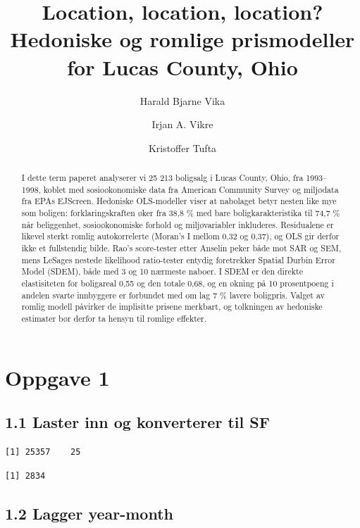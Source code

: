 \documentclass[
  norsk,
  a4paper,
]{article}
\title{Location, location, location? Hedoniske og romlige prismodeller
for Lucas County, Ohio}
\author{Harald Bjarne Vika \and Irjan A. Vikre \and Kristoffer Tufta}
\date{}
\renewcommand*\contentsname{Innholdsfortegnelse}
\newcommand\contentsname{Innholdsfortegnelse}
\begin{document}
\maketitle
\begin{abstract}
I dette term paperet analyserer vi 25 213 boligsalg i Lucas County,
Ohio, fra 1993--1998, koblet med sosioøkonomiske data fra American
Community Survey og miljødata fra EPAs EJScreen. Hedoniske OLS-modeller
viser at nabolaget betyr nesten like mye som boligen: forklaringskraften
øker fra 38,8 \% med bare boligkarakteristika til 74,7 \% når
beliggenhet, sosioøkonomiske forhold og miljøvariabler inkluderes.
Residualene er likevel sterkt romlig autokorrelerte (Moran's I mellom
0,32 og 0,37), og OLS gir derfor ikke et fullstendig bilde. Rao's
score-tester etter Anselin peker både mot SAR og SEM, mens LeSages
nestede likelihood ratio-tester entydig foretrekker Spatial Durbin Error
Model (SDEM), både med 3 og 10 nærmeste naboer. I SDEM er den direkte
elastisiteten for boligareal 0,55 og den totale 0,68, og en økning på 10
prosentpoeng i andelen svarte innbyggere er forbundet med om lag 7 \%
lavere boligpris. Valget av romlig modell påvirker de implisitte prisene
merkbart, og tolkningen av hedoniske estimater bør derfor ta hensyn til
romlige effekter.
\end{abstract}

\renewcommand*\contentsname{Innholdsfortegnelse}
{
\setcounter{tocdepth}{3}
\tableofcontents
}

\section{Oppgave 1}\label{oppgave-1}

\subsection{1.1 Laster inn og konverterer til
SF}\label{laster-inn-og-konverterer-til-sf}

\begin{verbatim}
[1] 25357    25
\end{verbatim}

\begin{verbatim}
[1] 2834
\end{verbatim}

\subsection{1.2 Lagger year-month}\label{lagger-year-month}
\end{document}
